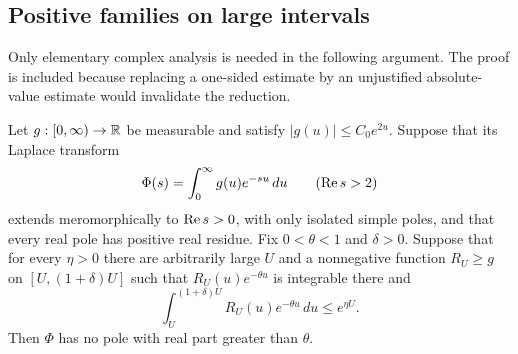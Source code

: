 \subsection{Positive families on large intervals}

Only elementary complex analysis is needed in the following argument.
The proof is included because replacing a one-sided estimate by an
unjustified absolute-value estimate would invalidate the reduction.


\begin{proposition}\label{prop:landau-independent}
Let $g:[0,\infty)\to\mathbb R$ be measurable and satisfy
$|g(u)|\le C_0e^{2u}$. Suppose that its Laplace transform
\[
 \Phi(s)=\int_0^\infty g(u)e^{-su}\,du\qquad(\operatorname{Re} s>2)
\]
extends meromorphically to $\operatorname{Re} s>0$, with only isolated simple poles,
and that every real pole has positive real residue.
Fix $0<\theta<1$ and $\delta>0$. Suppose that for every $\eta>0$
there are arbitrarily large $U$ and a nonnegative function $R_U\ge g$
on $[U,(1+\delta)U]$ such that $R_U(u)e^{-\theta u}$ is integrable there and
\[
 \int_U^{(1+\delta)U}R_U(u)e^{-\theta u}\,du\le e^{\eta U}.
\]
Then $\Phi$ has no pole with real part greater than $\theta$.
\end{proposition}

